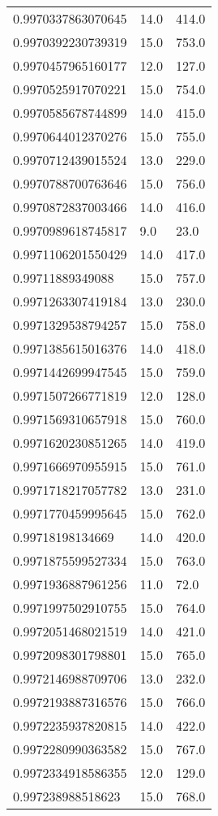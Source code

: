 \begin{center}
\begin{supertabular}[H]{p{0.30\textwidth}p{0.05\textwidth}p{0.05\textwidth}}
0.9970337863070645 & 14.0 & 414.0 \\ 
0.9970392230739319 & 15.0 & 753.0 \\ 
0.9970457965160177 & 12.0 & 127.0 \\ 
0.9970525917070221 & 15.0 & 754.0 \\ 
0.9970585678744899 & 14.0 & 415.0 \\ 
0.9970644012370276 & 15.0 & 755.0 \\ 
0.9970712439015524 & 13.0 & 229.0 \\ 
0.9970788700763646 & 15.0 & 756.0 \\ 
0.9970872837003466 & 14.0 & 416.0 \\ 
0.9970989618745817 & 9.0 & 23.0 \\ 
0.9971106201550429 & 14.0 & 417.0 \\ 
0.99711889349088 & 15.0 & 757.0 \\ 
0.9971263307419184 & 13.0 & 230.0 \\ 
0.9971329538794257 & 15.0 & 758.0 \\ 
0.9971385615016376 & 14.0 & 418.0 \\ 
0.9971442699947545 & 15.0 & 759.0 \\ 
0.9971507266771819 & 12.0 & 128.0 \\ 
0.9971569310657918 & 15.0 & 760.0 \\ 
0.9971620230851265 & 14.0 & 419.0 \\ 
0.9971666970955915 & 15.0 & 761.0 \\ 
0.9971718217057782 & 13.0 & 231.0 \\ 
0.9971770459995645 & 15.0 & 762.0 \\ 
0.99718198134669 & 14.0 & 420.0 \\ 
0.9971875599527334 & 15.0 & 763.0 \\ 
0.9971936887961256 & 11.0 & 72.0 \\ 
0.9971997502910755 & 15.0 & 764.0 \\ 
0.9972051468021519 & 14.0 & 421.0 \\ 
0.9972098301798801 & 15.0 & 765.0 \\ 
0.9972146988709706 & 13.0 & 232.0 \\ 
0.9972193887316576 & 15.0 & 766.0 \\ 
0.9972235937820815 & 14.0 & 422.0 \\ 
0.9972280990363582 & 15.0 & 767.0 \\ 
0.9972334918586355 & 12.0 & 129.0 \\ 
0.997238988518623 & 15.0 & 768.0 \\ 

\end{supertabular}
\end{center}
